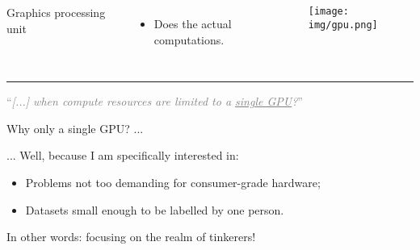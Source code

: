\begin{frame}
\begin{columns}
Graphics processing unit
\begin{itemize}
\item Does the actual computations.
\end{itemize}
\texttt{[image: img/gpu.png]}
\end{columns}
\vspace{0.5cm}
\pause
\rule{\textwidth}{0.7pt}

\vspace{0.5cm}

\begin{center}
\textcolor{gray}{``\textit{[...] when compute resources are limited to a \underline{single GPU}?}''}
\end{center}

Why only a single GPU? ...
\pause

\vspace{0.5cm}

... Well, because I am specifically interested in:
\begin{itemize}
\item Problems not too demanding for consumer-grade hardware;
\item Datasets small enough to be labelled by one person.
\end{itemize}
\pause
In other words: focusing on the realm of tinkerers!
\end{frame}

